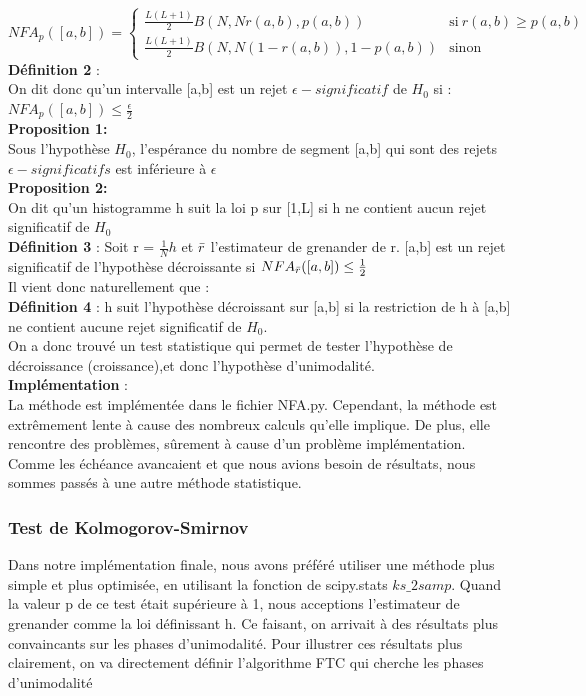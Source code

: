 \documentclass{article}
\begin{document}
{$NFA_{p}([a,b]) = \begin{cases}
\frac{L(L+1)}{2}B(N,Nr(a,b),p(a,b)) & \text{si} \ r(a,b) \geq p(a,b) \\
\frac{L(L+1)}{2}B(N,N(1-r(a,b)),1-p(a,b)) & \text{sinon}
\end{cases}
$
\textbf{Définition 2} : \\
On dit donc qu'un intervalle [a,b] est un rejet $\epsilon-significatif$ de $H_0$ si : \\ 
$NFA_p([a,b]) \leq \frac{\epsilon}{2}$\\
\textbf{Proposition 1: } \\
Sous l'hypothèse $H_0$, l'espérance du nombre de segment [a,b] qui sont des rejets $\epsilon-significatifs$ est inférieure à $\epsilon$ \\
\textbf{Proposition 2: } \\
On dit qu'un histogramme h suit la loi p sur [1,L] si h ne contient aucun rejet significatif de $H_0$\\
\textbf{Définition 3} : Soit r = $\frac{1}{N}h$ et $\Bar{r}$ l'estimateur de grenander de r. [a,b] est un rejet significatif de l'hypothèse décroissante si
$NFA_{\Bar{r}}([a,b]) \leq \frac{1}{2}$\\
Il vient donc naturellement que : \\
\textbf{Définition 4} :
h suit l'hypothèse décroissant sur [a,b] si la restriction de h à [a,b] ne contient aucune rejet significatif de $H_0$. \\
On a donc trouvé un test statistique qui permet de tester l'hypothèse de décroissance (croissance),et donc l'hypothèse d'unimodalité. \\
\textbf{Implémentation} : \\
La méthode est implémentée dans le fichier NFA.py. 
Cependant, la méthode est extrêmement lente à cause des nombreux calculs qu'elle implique. De plus, elle rencontre des problèmes, sûrement à cause d'un problème implémentation. Comme les échéance avancaient et que nous avions besoin de résultats, nous sommes passés à une autre méthode statistique. 
\subsubsection{Test de Kolmogorov-Smirnov} 
Dans notre implémentation finale, nous avons préféré utiliser une méthode plus simple et plus optimisée, en utilisant la fonction de scipy.stats $ks\_2samp$. Quand la valeur p de ce test était supérieure à 1, nous acceptions l'estimateur de grenander comme la loi définissant h. Ce faisant, on arrivait à des résultats plus convaincants sur les phases d'unimodalité. Pour illustrer ces résultats plus clairement, on va directement définir l'algorithme FTC qui cherche les phases d'unimodalité
}
\end{document}
